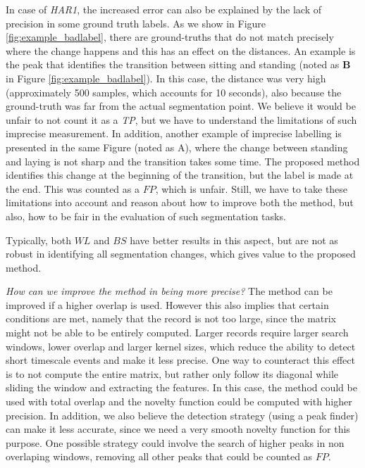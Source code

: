 In case of \textit{HAR1}, the increased error can also be explained by the lack of precision in some ground truth labels. As we show in Figure \ref{fig:example_badlabel}, there are ground-truths that do not match precisely where the change happens and this has an effect on the distances. An example is the peak that identifies the transition between sitting and standing (noted as \textbf{B} in Figure \ref{fig:example_badlabel}). In this case, the distance was very high (approximately 500 samples, which accounts for 10 seconds), also because the ground-truth was far from the actual segmentation point. We believe it would be unfair to not count it as a \textit{TP}, but we have to understand the limitations of such imprecise measurement. In addition, another example of imprecise labelling is presented in the same Figure (noted as A), where the change between standing and laying is not sharp and the transition takes some time. The proposed method identifies this change at the beginning of the transition, but the label is made at the end. This was counted as a $FP$, which is unfair. Still, we have to take these limitations into account and reason about how to improve both the method, but also, how to be fair in the evaluation of such segmentation tasks.

Typically, both $WL$ and $BS$ have better results in this aspect, but are not as robust in identifying all segmentation changes, which gives value to the proposed method.

\textit{How can we improve the method in being more precise?} The method can be improved if a higher overlap is used. However this also implies that certain conditions are met, namely that the record is not too large, since the matrix might not be able to be entirely computed. Larger records require larger search windows, lower overlap and larger kernel sizes, which reduce the ability to detect short timescale events and make it less precise. One way to counteract this effect is to not compute the entire matrix, but rather only follow its diagonal while sliding the window and extracting the features. In this case, the method could be used with total overlap and the novelty function could be computed with higher precision. In addition, we also believe the detection strategy (using a peak finder) can make it less accurate, since we need a very smooth novelty function for this purpose. One possible strategy could involve the search of higher peaks in non overlaping windows, removing all other peaks that could be counted as $FP$.

